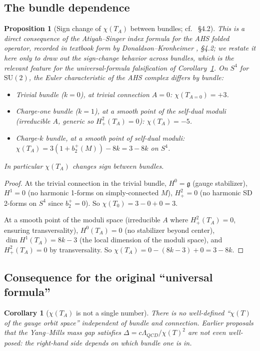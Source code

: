 \documentclass[11pt,letterpaper]{article}
\newtheorem{proposition}[theorem]{Proposition}
\newtheorem{corollary}[theorem]{Corollary}
\theoremstyle{definition}
\newcommand{\fg}{\mathfrak{g}}
\begin{document}
\subsection{The bundle dependence}

\begin{proposition}[Sign change of $\chi(T_A)$ between bundles; cf.\ \cite{DK1990} \S 4.2]\label{prop:chi-bundle}
This is a direct consequence of the Atiyah--Singer index formula for the AHS folded operator, recorded in textbook form by Donaldson--Kronheimer \cite{DK1990}, \S 4.2; we restate it here only to draw out the sign-change behavior across bundles, which is the relevant feature for the universal-formula falsification of Corollary~\ref{cor:chi-not-universal}. On $S^4$ for $\mathrm{SU}(2)$, the Euler characteristic of the AHS complex differs by bundle:
\begin{itemize}
\item Trivial bundle ($k=0$), at trivial connection $A=0$: $\chi(T_{A=0}) = +3$.
\item Charge-one bundle ($k=1$), at a \emph{smooth point} of the self-dual moduli (irreducible $A$, generic so $H^2_+(T_A) = 0$): $\chi(T_A) = -5$.
\item Charge-$k$ bundle, at a smooth point of self-dual moduli: $\chi(T_A) = 3(1+b_2^+(M)) - 8k = 3 - 8k$ on $S^4$.
\end{itemize}
In particular $\chi(T_A)$ changes sign between bundles.
\end{proposition}

\begin{proof}
At the trivial connection in the trivial bundle, $H^0 = \fg$ (gauge stabilizer), $H^1 = 0$ (no harmonic 1-forms on simply-connected $M$), $H^2_+ = 0$ (no harmonic SD 2-forms on $S^4$ since $b_2^+ = 0$). So $\chi(T_0) = 3 - 0 + 0 = 3$.

At a smooth point of the moduli space (irreducible $A$ where $H^2_+(T_A) = 0$, ensuring transversality), $H^0(T_A) = 0$ (no stabilizer beyond center), $\dim H^1(T_A) = 8k - 3$ (the local dimension of the moduli space), and $H^2_+(T_A) = 0$ by transversality. So $\chi(T_A) = 0 - (8k-3) + 0 = 3 - 8k$.
\end{proof}

\subsection{Consequence for the original ``universal formula''}

\begin{corollary}[$\chi(T_A)$ is not a single number]\label{cor:chi-not-universal}
There is no well-defined ``$\chi(T)$ of the gauge orbit space'' independent of bundle and connection. Earlier proposals that the Yang--Mills mass gap satisfies $\Delta = c\Lambda_{QCD}/\chi(T)^2$ are not even well-posed: the right-hand side depends on which bundle one is in.
\end{corollary}
\end{document}
